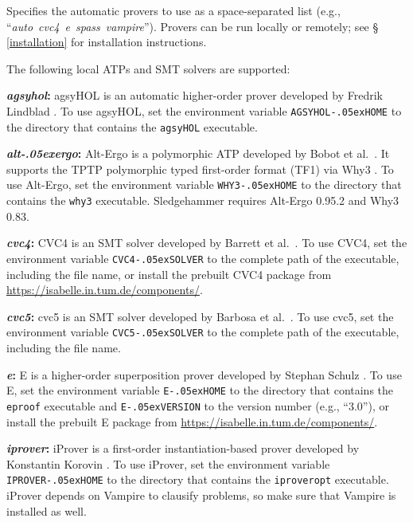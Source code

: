\documentclass[a4paper,12pt]{article}
\newcommand\download{\url{https://isabelle.in.tum.de/components/}}
\let\oldS=\S
\def\S{\oldS\,}
\renewcommand\_{\hbox{\textunderscore\kern-.05ex}}
\begin{document}
\begin{enum}
Specifies the automatic provers to use as a space-separated list (e.g.,
``\textit{auto}~\textit{cvc4}~\textit{e}~\textit{spass}~\textit{vampire\/}'').
Provers can be run locally or remotely; see \S\ref{installation} for
installation instructions.

The following local ATPs and SMT solvers are supported:

\begin{sloppy}
\begin{enum}
\item[\labelitemi] \textbf{\textit{agsyhol}:} agsyHOL is an automatic
higher-order prover developed by Fredrik Lindblad \cite{agsyHOL}. To use
agsyHOL, set the environment variable \texttt{AGSYHOL\_HOME} to the directory
that contains the \texttt{agsyHOL} executable.

\item[\labelitemi] \textbf{\textit{alt\_ergo}:} Alt-Ergo is a polymorphic
ATP developed by Bobot et al.\ \cite{alt-ergo}.
It supports the TPTP polymorphic typed first-order format (TF1) via Why3
\cite{why3}. To use Alt-Ergo, set the environment variable \texttt{WHY3\_HOME}
to the directory that contains the \texttt{why3} executable. Sledgehammer
requires Alt-Ergo 0.95.2 and Why3 0.83.

\item[\labelitemi] \textbf{\textit{cvc4}:} CVC4 is an SMT solver developed by
Barrett et al.\ \cite{cvc4}. To use CVC4,
set the environment variable \texttt{CVC4\_SOLVER} to the complete path of the
executable, including the file name, or install the prebuilt CVC4 package from
\download.

\item[\labelitemi] \textbf{\textit{cvc5}:} cvc5 is an SMT solver developed by
Barbosa et al.\ \cite{barbosa-et-al-cvc5}. To use cvc5,
set the environment variable \texttt{CVC5\_SOLVER} to the complete path of the
executable, including the file name.

\item[\labelitemi] \textbf{\textit{e}:} E is a higher-order superposition prover
developed by Stephan Schulz \cite{schulz-2019}. To use E, set the environment
variable \texttt{E\_HOME} to the directory that contains the \texttt{eproof}
executable and \texttt{E\_VERSION} to the version number (e.g., ``3.0''), or
install the prebuilt E package from \download.

\item[\labelitemi] \textbf{\textit{iprover}:} iProver is a first-order
instantiation-based prover developed by Konstantin Korovin \cite{korovin-2009}.
To use iProver, set the environment variable \texttt{IPROVER\_HOME} to the
directory that contains the \texttt{iproveropt} executable. iProver depends on
Vampire to clausify problems, so make sure that Vampire is installed as well.


\end{enum}
\end{sloppy}
\end{enum}
\end{document}
